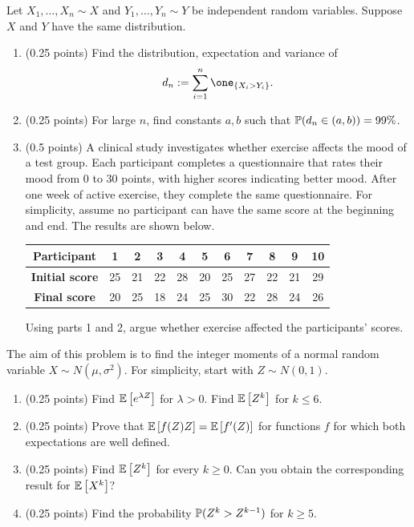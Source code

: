 \documentclass[a4paper]{report}
\begin{document}
\begin{problem}

Let $X_1,\dots,X_n\sim X$ and
$Y_1,\dots,Y_n\sim Y$ be independent random variables.
Suppose $X$ and $Y$ have the same distribution.
\begin{enumerate}
    \item (0.25 points)
    Find the distribution, expectation and variance of
    \[
    d_n := \sum_{i=1}^n \one_{\{X_i > Y_i\}}.
    \]
    \item (0.25 points)
    For large $n$, find constants
    $a,b$ such that
    $\P(d_n \in (a,b)) = 99\%$.


\item (0.5 points)
A clinical study investigates whether exercise affects
the mood of a test group. Each participant completes a questionnaire that rates their mood
from 0 to 30 points, with higher scores indicating better mood.
After one week of active exercise, they complete the same questionnaire. For simplicity, assume no participant can have the same score at the beginning and end. The results are shown below.


\begin{table}[h]
  \centering
  \begin{tabular}{c|cccccccccc}
    \textbf{Participant} & 1 & 2 & 3 & 4 & 5 & 6 & 7 & 8 & 9 & 10 \\
    \hline
    \textbf{Initial score} & 25 & 21 & 22 & 28 & 20 & 25 & 27 & 22 & 21 & 29 \\
    \textbf{Final score} & 20 & 25 & 18 & 24 & 25 & 30 & 22 & 28 & 24 & 26 \\
  \end{tabular}
\end{table}


Using parts 1 and 2, argue whether exercise affected the participants' scores.
\end{enumerate}
\end{problem}

\begin{problem}
    The aim of this problem is to find
    the integer moments of
    a normal random variable $X\sim N(\mu,\sigma^2)$. For simplicity, start with $Z\sim N(0,1)$.
\begin{enumerate}
    \item (0.25 points) Find
    $\Ebb{e^{\lambda Z}}$ for $\lambda>0$. Find $\Ebb{Z^k}$ for $k\leq6$.
    \item (0.25 points)
    Prove that $\Ebb{f(Z)Z}=\Ebb{f'(Z)}$ for functions $f$ for which both expectations are well defined.
    \item (0.25 points)
    Find $\Ebb{Z^k}$ for every $k\geq0$. Can you obtain the corresponding result for
     $\Ebb{X^k}$?
    \item (0.25 points) Find the probability
    $\P(Z^k>Z^{k-1})$ for $k\geq5$.
    \end{enumerate}
\end{problem}
\end{document}
